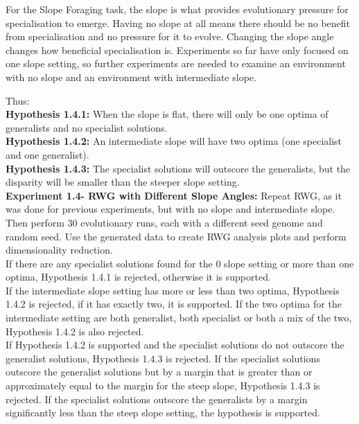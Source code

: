 \documentclass[12pt]{article}
\begin{document}
For the Slope Foraging task, the slope is what provides evolutionary pressure for specialisation to emerge.
Having no slope at all means there should be no benefit from specialisation and no pressure for it to evolve.
Changing the slope angle changes how beneficial specialisation is. 
Experiments so far have only focused on one slope setting, so further experiments are needed to examine an environment with no slope and an environment with intermediate slope.

Thus:\\

\textbf{Hypothesis 1.4.1:} When the slope is flat, there will only be one optima of generalists and no specialist solutions.\\

\textbf{Hypothesis 1.4.2:} An intermediate slope will have two optima (one specialist and one generalist).\\

\textbf{Hypothesis 1.4.3:} The specialist solutions will outscore the generalists, but the disparity will be smaller than the steeper slope setting. \\

\textbf{Experiment 1.4- RWG with Different Slope Angles:} Repeat RWG, as it was done for previous experiments, but with no slope and intermediate slope.
Then perform 30 evolutionary runs, each with a different seed genome and random seed.
Use the generated data to create RWG analysis plots and perform dimensionality reduction.\\

If there are any specialist solutions found for the 0 slope setting or more than one optima, Hypothesis 1.4.1 is rejected, otherwise it is supported.\\

If the intermediate slope setting has more or less than two optima, Hypothesis 1.4.2 is rejected, if it has exactly two, it is supported.
If the two optima for the intermediate setting are both generalist, both specialist or both a mix of the two, Hypothesis 1.4.2 is also rejected.\\

If Hypothesis 1.4.2 is supported and the specialist solutions do not outscore the generalist solutions, Hypothesis 1.4.3 is rejected.
If the specialist solutions outscore the generalist solutions but by a margin that is greater than or approximately equal to the margin for the steep slope, Hypothesis 1.4.3 is rejected.
If the specialist solutions outscore the generalists by a margin significantly less than the steep slope setting, the hypothesis is supported.\\
\end{document}
